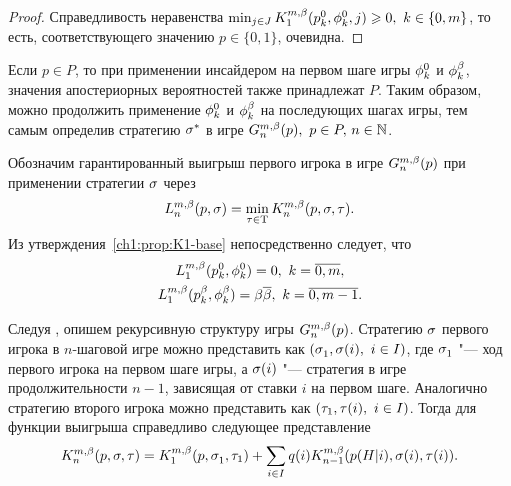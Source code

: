 {\begin{proof}
  Справедливость неравенства $\min_{j \in J} \K*{1}(\pEven, \fEven, j) \geq 0,\ k \in \{0, m\}$, то есть, соответствующего значению $p \in \{0, 1\}$, очевидна.
\end{proof}

\begin{remark}
  \label{ch1:remark:posterior-probs}
  Если $p \in P$, то при применении инсайдером на первом шаге игры $\phi^0_{k}$ и $\phi^{\beta}_{k}$, значения апостериорных вероятностей также принадлежат $P$.
  Таким образом, можно продолжить применение $\phi^0_{k}$ и $\phi^{\beta}_{k}$ на последующих шагах игры, тем самым определив стратегию $\sigma^*$ в игре $\theG*{n}(p),\ p \in P, \, n \in \mathbb{N}$.
\end{remark}

Обозначим гарантированный выигрыш первого игрока в игре $\theG*{n}(p)$ при применении стратегии $\sigma$ через
\begin{equation*}
  \L*{n}(p, \sigmar) = \min_{\taur \in \Tau} \K*{n}(p, \sigmar, \taur).
\end{equation*}
Из утверждения~\ref{ch1:prop:K1-base} непосредственно следует, что
\begin{equation}
  \label{ch1:eq:L_1(p)}
  \begin{gathered}
  \L*{1}(\pEven, \fEven) = 0,\ k = \overline{0,m},\\
  \L*{1}(\pOdd, \fOdd) = \Co \DCo,\ k = \overline{0,m-1}.
  \end{gathered}
\end{equation}

Следуя \cite{domansky07}, опишем рекурсивную структуру игры $\theG*{n}(p)$.
Стратегию $\sigma$ первого игрока в $n$-шаговой игре можно представить как
$(\sigmas{1}, \sigmara{i},\ i \in I)$, где $\sigmas{1}$ "--- ход первого игрока на первом шаге игры, а $\sigma(i)$ "--- стратегия в игре продолжительности $n-1$, зависящая от ставки $i$ на первом шаге.
Аналогично стратегию второго игрока можно представить как $(\tau_{1}, \tau(i),\ i \in I)$.
Тогда для функции выигрыша справедливо следующее представление
\begin{equation}
  \label{ch1:eq:recursive-structure}
  \K*{n}(p, \sigmar, \taur) = 
  \K*{1}(p, \sigmas{1}, \taus{1}) + 
  \sum_{i \in I} \qc{i} \K*{n-1}(\pac{H}{i}, \sigmara{i}, \taura{i}).
\end{equation}

}
